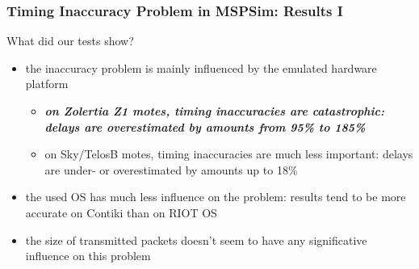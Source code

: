 \documentclass[10pt,c]{beamer}
\renewcommand{\emph}[1]{\textbf{\textit{#1}}}
\begin{document}
\begin{frame}
\frametitle{Timing Inaccuracy Problem in MSPSim: Results I}
\begin{block}{What did our tests show?}
\begin{itemize}
\item the inaccuracy problem is mainly influenced by the emulated hardware
platform
  \begin{itemize}
  \item \emph{on Zolertia Z1 motes, timing inaccuracies are catastrophic:
  delays are overestimated by amounts from 95\% to 185\%}
  \item on Sky/TelosB motes, timing inaccuracies are much less important:
  delays are under- or overestimated by amounts up to 18\%
  \end{itemize}
\item the used OS has much less influence on the problem: results tend
to be more accurate on Contiki than on RIOT OS
\item the size of transmitted packets doesn't seem to have any
significative influence on this problem
\end{itemize}
\end{block}
\end{frame}
\end{document}
